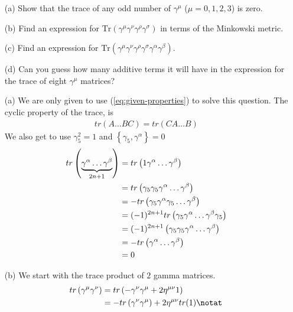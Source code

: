 \begin{itemize}
    \item[(a)] Show that the trace of any odd number of $\gamma^\mu$ ($\mu = 0, 1, 2, 3$) is zero.
    \item[(b)] Find an expression for $\text{Tr}(\gamma^\mu \gamma^\nu \gamma^\rho \gamma^\sigma)$ in terms of the Minkowski metric.
    \item[(c)] Find an expression for $\text{Tr}(\gamma^\mu \gamma^\nu \gamma^\rho \gamma^\sigma \gamma^\alpha \gamma^\beta)$.
    \item[(d)] Can you guess how many additive terms it will have in the expression for the trace of eight $\gamma^\mu$ matrices?
\end{itemize}
\bigskip\bigskip\hline\hline\bigskip
\begin{enumerate}
    \item [(a)] We are only given to use (\ref{eq:given-properties}) to solve this question. The cyclic property of the trace, is 
    \begin{align}
        tr\left(A\ldots BC\right)=tr\left(CA\ldots B\right)
    \end{align}
    We also get to use $\displaystyle\gamma_5^2=1$ and $\left\{\gamma_5,\gamma^\alpha\right\}=0$
    \begin{align}
        tr\left(\underbrace{\gamma^\alpha\ldots\gamma^\beta}_{2n+1}\right)&=tr\left(1\gamma^\alpha\ldots\gamma^\beta\right)\notag\\
        &=tr\left(\gamma_5\gamma_5\gamma^\alpha\ldots\gamma^\beta\right)\notag\\
        &=-tr\left(\gamma_5\gamma^\alpha\gamma_5\ldots\gamma^\beta\right)\notag\\
        &=(-1)^{2n+1}tr\left(\gamma_5\gamma^\alpha\ldots\gamma^\beta\gamma_5\right)\notag\\
        &=(-1)^{2n+1}\left(\gamma_5\gamma_5\gamma^\alpha\ldots\gamma^\beta\right)\notag\\
        &=-tr\left(\gamma^\alpha\ldots\gamma^\beta\right)\notag\\
        &=0
    \end{align}
    \item [(b)] We start with the trace product of $2$ gamma matrices.
    \begin{align}
        tr\left(\gamma^\mu\gamma^\nu\right)&=tr\left(-\gamma^\nu\gamma^\mu+2\eta^{\mu\nu}1\right)\notag\\
        &=-tr\left(\gamma^\nu\gamma^\mu\right)+2\eta^{\mu\nu}tr(1)\notat\\

\end{align}
\end{enumerate}

